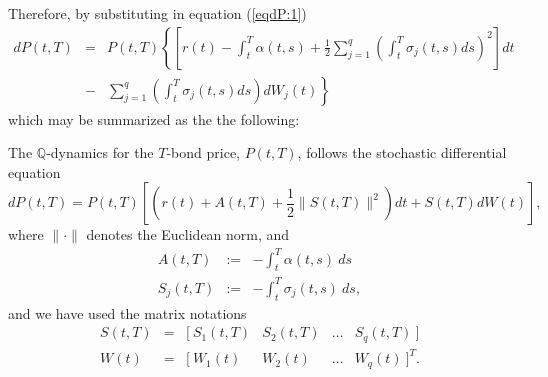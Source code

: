 Therefore, by substituting in equation (\ref{eqdP:1}) 
\begin{equation}
\begin{array}{ccl}
dP(t,T) & = &
P(t,T) \left\{ \left[
    r(t)-\int_t^T\alpha(t,s)+\frac{1}{2} \sum_{j=1}^q\left(\int_t^T
      \sigma_j(t,s) ds \right)^2 \right] dt \right.\\
& - & \left. \sum^q_{j=1}\left(\int_t^T \sigma_j (t,s) ds\right)dW_j(t)\right\}
\end{array}
\end{equation}
which may be summarized as the the following:
\begin{corol}
The $\mathbb{Q}$-dynamics for the $T$-bond price, $P(t,T)$, follows
the stochastic differential equation
\begin{equation}
\label{eqdP:2}
dP(t,T)= P(t,T)
\left[\left( r(t)+A(t,T)+\frac{1}{2}\|S(t,T)\|^2 \right) dt +
  S(t,T) dW(t)\right], 
\end{equation}
where $\|\cdot\|$ denotes the Euclidean norm, and
\begin{equation}
\nonumber
\begin{array}{rcl}
A(t,T) & := & -\int_t^T\alpha(t,s)\:ds \\
S_j(t,T) & := & -\int_t^T \sigma_j(t,s)\:ds,
\end{array}
\end{equation}
and we have used the matrix notations
$$
\begin{array}{rcllll}
S(t,T) & = & [~S_1(t,T) & S_2(t,T) & \dots & S_q(t,T)~]\\
W(t) & = & [~W_1(t) & W_2(t) & \dots & W_q(t)~]^T.
\end{array}
$$
\end{corol}
